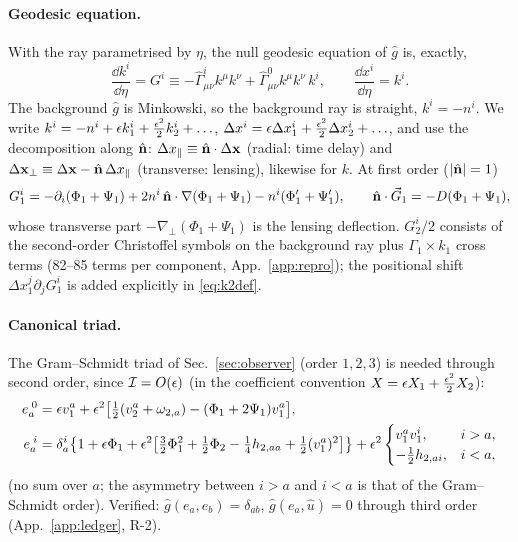 \paragraph{Geodesic equation.}  With the ray parametrised by $\eta$, the null geodesic equation of $\hat g$ is, exactly,
\begin{equation}
\frac{\dd k^i}{\dd\eta}=G^i\equiv-\hat\Gamma^i_{\mu\nu}k^\mu k^\nu+\hat\Gamma^0_{\mu\nu}k^\mu k^\nu\,k^i,\qquad
\frac{\dd x^i}{\dd\eta}=k^i .
\label{eq:geodesic}
\end{equation}
The background $\hat g$ is Minkowski, so the background ray is straight, $k^i=-n^i$.  We write
$k^i=-n^i+\epsilon k_1^i+\tfrac{\epsilon^2}2k_2^i+\ldots$, $\Delta x^i=\epsilon\Delta x_1^i+\tfrac{\epsilon^2}2\Delta x_2^i+\ldots$, and use the
decomposition along $\hat{\mathbf n}$: $\Delta x_\parallel\equiv\hat{\mathbf n}\cdot\Delta\mathbf x$ (radial: time delay) and
$\Delta\mathbf x_\perp\equiv\Delta\mathbf x-\hat{\mathbf n}\,\Delta x_\parallel$ (transverse: lensing), likewise for $k$.  At first order ($|\hat{\mathbf n}|=1$)
\begin{equation}
G_1^i=-\partial_i(\Phi_1+\Psi_1)+2n^i\,\hat{\mathbf n}\cdot\nabla(\Phi_1+\Psi_1)-n^i(\Phi_1'+\Psi_1'),\qquad
\hat{\mathbf n}\cdot\vec G_1=-D(\Phi_1+\Psi_1),
\label{eq:G1}
\end{equation}
whose transverse part $-\nabla_\perp(\Phi_1+\Psi_1)$ is the lensing deflection.  $G_2^i/2$ consists of the second-order
Christoffel symbols on the background ray plus $\Gamma_1\times k_1$ cross terms (82--85 terms per component, App.~\ref{app:repro});
the positional shift $\Delta x_1^j\partial_jG_1^i$ is added explicitly in \eqref{eq:k2def}.

\paragraph{Canonical triad.}  The Gram--Schmidt triad of Sec.~\ref{sec:observer} (order $1,2,3$) is needed through
second order, since $\mathcal I=O(\epsilon)$ (in the coefficient convention $X=\epsilon X_1+\tfrac{\epsilon^2}2X_2$):
\begin{align}
e_a^{\;0}&=\epsilon v^a_1+\epsilon^2\big[\tfrac12(v^a_2+\omega_{2,a})-(\Phi_1+2\Psi_1)v^a_1\big],\nonumber\\
e_a^{\;i}&=\delta_a^i\big\{1+\epsilon\Phi_1+\epsilon^2\big[\tfrac32\Phi_1^2+\tfrac12\Phi_2-\tfrac14h_{2,aa}+\tfrac12(v^a_1)^2\big]\big\}
+\epsilon^2\begin{cases}v^a_1v^i_1,& i>a,\\ -\tfrac12h_{2,ai},& i<a,\end{cases}
\label{eq:triad}
\end{align}
(no sum over $a$; the asymmetry between $i>a$ and $i<a$ is that of the Gram--Schmidt order).  Verified:
$\hat g(e_a,e_b)=\delta_{ab}$, $\hat g(e_a,\hat u)=0$ through third order (App.~\ref{app:ledger}, R-2).

